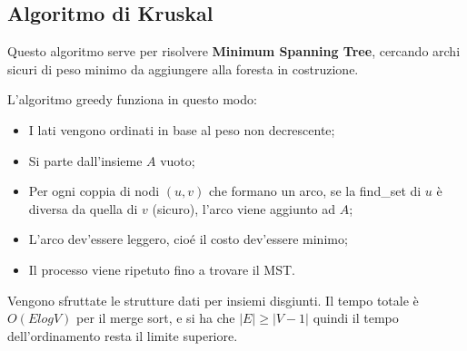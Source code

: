 \subsection{Algoritmo di Kruskal}
Questo algoritmo serve per risolvere \textbf{Minimum Spanning Tree}, cercando archi sicuri di peso minimo da aggiungere alla foresta in costruzione.

L'algoritmo greedy funziona in questo modo:
\begin{itemize}
	\item I lati vengono ordinati in base al peso non decrescente;
	\item Si parte dall'insieme $A$ vuoto;
	\item Per ogni coppia di nodi $(u, v)$ che formano un arco, se la find\_set di $u$ è diversa da quella di $v$ (sicuro), l'arco viene aggiunto ad $A$;
	\item L'arco dev'essere leggero, cioé il costo dev'essere minimo;
	\item Il processo viene ripetuto fino a trovare il MST.
\end{itemize}

Vengono sfruttate le strutture dati per insiemi disgiunti. Il tempo totale è $O(ElogV)$ per il merge sort, e si ha che $|E| \geq |V - 1|$ quindi il tempo dell'ordinamento resta il limite superiore.

